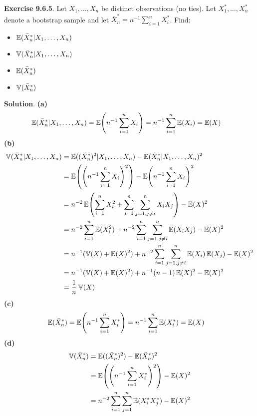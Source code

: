 \textbf{Exercise 9.6.5}. Let \(X_{1}, \dots, X_{n}\) be distinct
observations (no ties). Let \(X_{1}^{*}, \dots, X_{n}^{*}\) denote a bootstrap
sample and let \(\bar{X}_{n}^{*} = n^{-1}\sum_{i=1}^{n}X_{i}^{*}\). Find:
\begin{itemize}[tightlist]
\item
  \(\operatorname{\mathbb{E}}(\bar{X}_{n}^{*} | X_{1}, \dots, X_{n})\)
\item
  \(\operatorname{\mathbb{V}}(\bar{X}_{n}^{*} | X_{1}, \dots, X_{n})\)
\item
  \(\operatorname{\mathbb{E}}(\bar{X}_{n}^{*})\)
\item
  \(\operatorname{\mathbb{V}}(\bar{X}_{n}^{*})\)
\end{itemize}

\textbf{Solution}.
\textbf{(a)} \begin{align*}
\EXP(\bar{X}_{n}^{*} | X_{1}, \dots, X_{n}) &= \EXP\left(n^{-1}\sum_{i=1}^{n}X_{i}\right) = n^{-1}\sum_{i=1}^{n} \EXP(X_{i}) = \EXP(X)
\end{align*}
\textbf{(b)} \begin{align*}
\VAR(\bar{X}_{n}^{*} | X_{1}, \dots, X_{n}) & =
\EXP((\bar{X}_{n}^{*})^{2} | X_{1}, \dots, X_{n}) - \EXP(\bar{X}_{n}^{*} | X_{1}, \dots, X_{n})^{2} \\
&= \EXP\left(\left(n^{-1}\sum_{i=1}^{n}X_{i}\right)^{2}\right) - \EXP\left(n^{-1}\sum_{i=1}^{n}X_{i}\right)^{2} \\
&= n^{-2} \EXP\left(\sum_{i=1}^{n}X_{i}^{2} + \sum_{i=1}^{n} \sum_{j=1, j \neq i}^{n} X_{i} X_{j}\right) - \EXP(X)^{2} \\
&= n^{-2} \sum_{i=1}^{n} \EXP(X_{i}^{2}) + n^{-2} \sum_{i=1}^{n} \sum_{j=1, j \neq i}^{n} \EXP(X_{i} X_{j}) - \EXP(X)^{2}  \\
&= n^{-1} (\VAR(X) + \EXP(X)^{2}) + n^{-2} \sum_{i=1}^{n} \sum_{j=1, j \neq i}^{n} \EXP(X_{i}) \EXP(X_{j}) - \EXP(X)^{2} \\
&= n^{-1} (\VAR(X) + \EXP(X)^{2}) + n^{-1} (n - 1) \EXP(X)^{2} - \EXP(X)^{2} \\
&= \frac{1}{n}\VAR(X)
\end{align*}
\textbf{(c)} \begin{align*}
\EXP(\bar{X}_{n}^{*}) &= \EXP\left(n^{-1} \sum_{i=1}^{n}X_{i}^{*}\right) = n^{-1} \sum_{i=1}^{n} \EXP(X_{i}^{*}) = \EXP(X)
\end{align*}
\textbf{(d)} \begin{align*}
\VAR(\bar{X}_{n}^{*}) &= \EXP((\bar{X}_{n}^{*})^{2}) - \EXP(\bar{X}_{n}^{*})^{2} \\
&= \EXP\left(\left(n^{-1} \sum_{i=1}^{n}X_{i}^{*}\right)^{2}\right) - \EXP(X)^{2} \\
&= n^{-2} \sum_{i=1}^{n}\sum_{j=1}^{n} \EXP(X_{i}^{*} X_{j}^{*}) - \EXP(X)^{2}
\end{align*}
